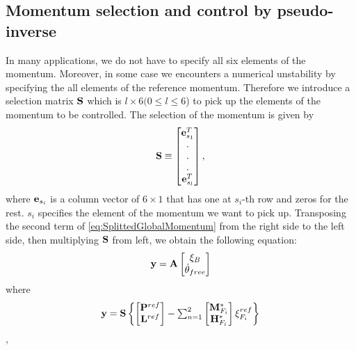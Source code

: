 \subsection{Momentum selection and control by pseudo-inverse}
In many applications, we do not have to specify all six elements of the momentum.
Moreover, in some case we encounters a numerical unstability by specifying the all
elements of the reference momentum.
Therefore we introduce a selection matrix ${\bf S}$ which is $l\times 6 (0 \le l \leq 6 $)
to pick up the elements of the momentum to be controlled. The selection of the momentum
is given by
\begin{equation}
{\bf S} \equiv
\left[
\begin{matrix}
{\bf e}^T_{s_1} \\
. \\
. \\
.\\
{\bf e}^T_{s_l} \\
\end{matrix}
\right],
\end{equation}
where ${\bf e}_{s_i}$ is a column vector of $6 \times 1$ that has one at $s_i$-th row
and zeros for the rest. $s_i$ specifies the element of the momentum we want to pick up.
Transposing the second term of \ref{eq:SplittedGlobalMomentum} from the right side to
the left side, then multiplying ${\bf S}$ from left, we obtain the following equation:
\begin{equation}
{\bf y} = {\bf A}
\left[
\begin{matrix}
\xi_{B}\\
\dot{\theta}_{free}\\
\end{matrix}
\right]
\label{eq:TheLinearSystem}
\end{equation}
where
\begin{equation}
{\bf y} = {\bf S}
\left\{
\begin{matrix}
\left[
\begin{matrix}
{\bf P}^{ref} \\
{\bf L}^{ref} \\
\end{matrix}
\right]
-
\sum^{2}_{n=1}
\left[
\begin{matrix}
{\bf M}^*_{F_i} \\
{\bf H}^*_{F_i} \\
\end{matrix}
\right]
\xi^{ref}_{F_i}
\end{matrix}
\right\}
\end{equation},
